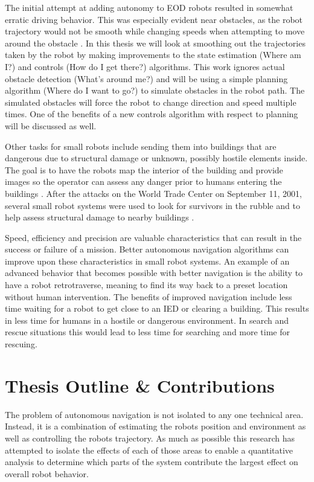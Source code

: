 The initial attempt at adding autonomy to EOD robots resulted in somewhat erratic driving behavior. This was especially evident near obstacles, as the robot trajectory would not be smooth while changing speeds when attempting to move around the obstacle \cite{Bruch00}. In this thesis we will look at smoothing out the trajectories taken by the robot by making improvements to the state estimation (Where am I?) and controls (How do I get there?) algorithms. This work ignores actual obstacle detection (What's around me?) and will be using a simple planning algorithm (Where do I want to go?) to simulate obstacles in the robot path. The simulated obstacles will force the robot to change direction and speed multiple times. One of the benefits of a new controls algorithm with respect to planning will be discussed as well.

Other tasks for small robots include sending them into buildings that are dangerous due to structural damage or unknown, possibly hostile elements inside. The goal is to have the robots map the interior of the building and provide images so the operator can assess any danger prior to humans entering the buildings \cite{CongressUGV06}. After the attacks on the World Trade Center on September 11, 2001, several small robot systems were used to look for survivors in the rubble and to help assess structural damage to nearby buildings \cite{Everett02}.

Speed, efficiency and precision are valuable characteristics that can result in the success or failure of a mission. Better autonomous navigation algorithms can improve upon these characteristics in small robot systems. An example of an advanced behavior that becomes possible with better navigation is the ability to have a robot retrotraverse, meaning to find its way back to a preset location without human intervention. The benefits of improved navigation include less time waiting for a robot to get close to an IED or clearing a building. This results in less time for humans in a hostile or dangerous environment. In search and rescue situations this would lead to less time for searching and more time for rescuing.

\section{Thesis Outline \& Contributions}
\label{sec:outline}
The problem of autonomous navigation is not isolated to any one technical area. Instead, it is a combination of estimating the robots position and environment as well as controlling the robots trajectory. As much as possible this research has attempted to isolate the effects of each of those areas to enable a quantitative analysis to determine which parts of the system contribute the largest effect on overall robot behavior.

